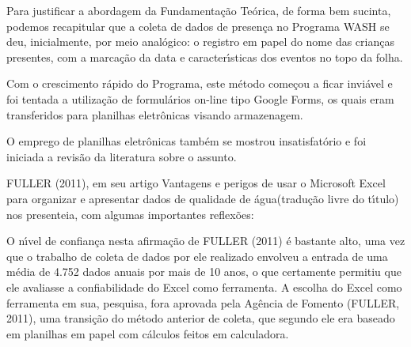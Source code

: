 \documentclass[
12pt,		%
openright,	%
twoside,  %
a4paper,			%
chapter=TITLE,		%
english,			%
french,				%
spanish,			%
brazil				%
]{USPSC-classe/USPSC}
\begin{document}
Para justificar a abordagem da Fundamenta\c{c}\~ao Te\'orica, de forma bem sucinta, podemos recapitular que a coleta de dados de presen\c{c}a no  Programa WASH se deu, inicialmente, por meio anal\'ogico: o registro em papel do nome das crian\c{c}as presentes, com a marca\c{c}\~ao da data e caracter\'{\i}sticas dos eventos no topo da folha.








Com o crescimento r\'apido do Programa, este m\'etodo come\c{c}ou a ficar invi\'avel e foi tentada a utiliza\c{c}\~ao de formul\'arios on-line tipo \textquotedbl Google Forms\textquotedbl , os quais eram transferidos para planilhas eletr\^onicas visando armazenagem.








O emprego de planilhas eletr\^onicas tamb\'em se mostrou insatisfat\'orio e foi iniciada a revis\~ao da literatura sobre o assunto.








FULLER (2011), em seu artigo \textquotedbl Vantagens e perigos de usar o Microsoft Excel para organizar e apresentar dados de qualidade de \'agua\textquotedbl  (tradu\c{c}\~ao livre do t\'{\i}tulo) nos presenteia, com algumas importantes reflex\~oes:









\noindent\begin{center}\mbox{\centering{}}\end{center}


O n\'{\i}vel de confian\c{c}a nesta afirma\c{c}\~ao de  FULLER (2011) \'e bastante alto, uma vez que o trabalho de coleta de dados por ele realizado envolveu a entrada de uma m\'edia de 4.752 dados anuais por mais de 10 anos, o que certamente permitiu que ele avaliasse a confiabilidade do Excel como ferramenta. A escolha do Excel como ferramenta em sua, pesquisa, fora aprovada pela Ag\^encia de Fomento  (FULLER, 2011), uma transi\c{c}\~ao do m\'etodo anterior de coleta, que segundo ele era baseado em planilhas em papel com c\'alculos feitos em calculadora.
\end{document}

